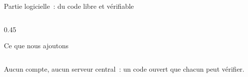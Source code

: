 \begin{frame}{Partie logicielle~: du code libre et vérifiable}
\begin{columns}[T]
\begin{column}{0.45\textwidth}
\begin{encadre}{Ce que nous ajoutons}
\begin{numeros}
        \end{numeros}
      \end{encadre}
    \end{column}
  \end{columns}
  \vspace{-0.25cm}
  \begin{pointcle}\centering\footnotesize
    Aucun compte, aucun serveur central~: un code ouvert que chacun peut vérifier.
  \end{pointcle}
\end{frame}

